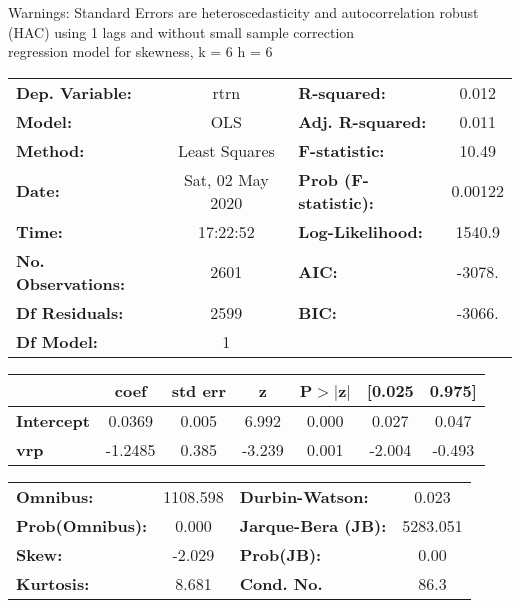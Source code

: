 Warnings: \newline
 [1] Standard Errors are heteroscedasticity and autocorrelation robust (HAC) using 1 lags and without small sample correction\\ 

regression model for skewness, k = 6 h = 6\begin{center}
\begin{tabular}{lclc}
\toprule
\textbf{Dep. Variable:}    &       rtrn       & \textbf{  R-squared:         } &     0.012   \\
\textbf{Model:}            &       OLS        & \textbf{  Adj. R-squared:    } &     0.011   \\
\textbf{Method:}           &  Least Squares   & \textbf{  F-statistic:       } &     10.49   \\
\textbf{Date:}             & Sat, 02 May 2020 & \textbf{  Prob (F-statistic):} &  0.00122    \\
\textbf{Time:}             &     17:22:52     & \textbf{  Log-Likelihood:    } &    1540.9   \\
\textbf{No. Observations:} &        2601      & \textbf{  AIC:               } &    -3078.   \\
\textbf{Df Residuals:}     &        2599      & \textbf{  BIC:               } &    -3066.   \\
\textbf{Df Model:}         &           1      & \textbf{                     } &             \\
\bottomrule
\end{tabular}
\begin{tabular}{lcccccc}
                   & \textbf{coef} & \textbf{std err} & \textbf{z} & \textbf{P$> |$z$|$} & \textbf{[0.025} & \textbf{0.975]}  \\
\midrule
\textbf{Intercept} &       0.0369  &        0.005     &     6.992  &         0.000        &        0.027    &        0.047     \\
\textbf{vrp}       &      -1.2485  &        0.385     &    -3.239  &         0.001        &       -2.004    &       -0.493     \\
\bottomrule
\end{tabular}
\begin{tabular}{lclc}
\textbf{Omnibus:}       & 1108.598 & \textbf{  Durbin-Watson:     } &    0.023  \\
\textbf{Prob(Omnibus):} &   0.000  & \textbf{  Jarque-Bera (JB):  } & 5283.051  \\
\textbf{Skew:}          &  -2.029  & \textbf{  Prob(JB):          } &     0.00  \\
\textbf{Kurtosis:}      &   8.681  & \textbf{  Cond. No.          } &     86.3  \\
\bottomrule
\end{tabular}
\end{center}

